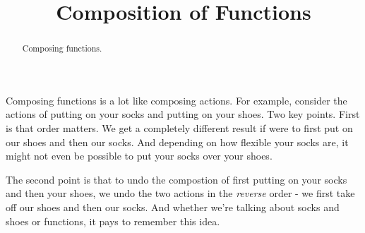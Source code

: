\documentclass{ximera}
\title{Composition of Functions}
\begin{document}
\begin{abstract}
Composing functions.
\end{abstract}
\maketitle


Composing functions is a lot like composing actions. For example, consider the actions of putting on your socks and putting on your shoes. Two key points. First is that order matters. We get a completely different result if were to first put on our shoes and then our socks. And depending on how flexible your socks are, it might not even be possible to put your socks over your shoes.

The second point is that to undo the compostion of first putting on your socks and then your shoes, we undo the two actions in the \emph{reverse} order - we first take off our shoes and then our socks. And whether we're talking about socks and shoes or functions, it pays to remember this idea.
\end{document}
